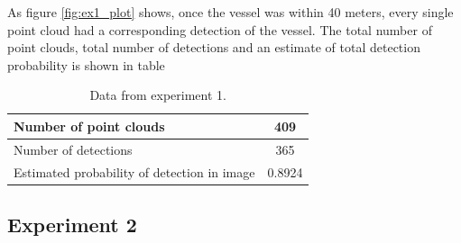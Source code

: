 As figure \ref{fig:ex1_plot} shows, once the vessel was within 40 meters, every single point cloud had a corresponding detection of the vessel.
The total number of point clouds, total number of detections and an estimate of total detection probability is shown in table
\begin{table}[H]
	\centering
	\begin{tabularx}{.7\linewidth}{L c}
		\toprule
		Number of point clouds & 409\\
		\midrule
		Number of detections & 365\\
		\midrule
		Estimated probability of detection in image & 0.8924 \\
		\bottomrule
	\end{tabularx}
\caption{Data from experiment 1.}
\label{tab:exp1}
\end{table}
\subsection{Experiment 2}

